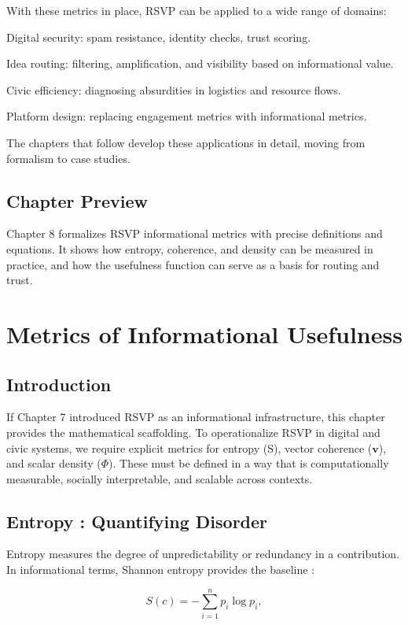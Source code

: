 \documentclass{book}
\begin{document}
With these metrics in place, RSVP can be applied to a wide range of domains:

Digital security: spam resistance, identity checks, trust scoring.

Idea routing: filtering, amplification, and visibility based on informational value.

Civic efficiency: diagnosing absurdities in logistics and resource flows.

Platform design: replacing engagement metrics with informational metrics.

The chapters that follow develop these applications in detail, moving from formalism to case studies.

\section{Chapter Preview}

Chapter 8 formalizes RSVP informational metrics with precise definitions and equations. It shows how entropy, coherence, and density can be measured in practice, and how the usefulness function can serve as a basis for routing and trust.

\chapter{Metrics of Informational Usefulness}

\section{Introduction}

If Chapter 7 introduced RSVP as an informational infrastructure, this chapter provides the mathematical scaffolding. To operationalize RSVP in digital and civic systems, we require explicit metrics for entropy (S), vector coherence (\(\mathbf{v}\)), and scalar density (\(\Phi\)). These must be defined in a way that is computationally measurable, socially interpretable, and scalable across contexts.

\section{Entropy : Quantifying Disorder}

Entropy measures the degree of unpredictability or redundancy in a contribution. In informational terms, Shannon entropy provides the baseline \cite{shannon1948}:

\[ S(c) = - \sum_{i=1}^{n} p_i \log p_i, \]
\end{document}
